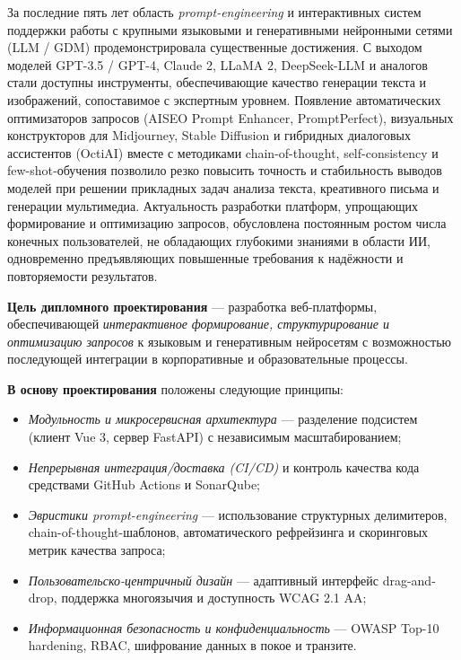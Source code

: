 
За последние пять лет область \textit{prompt-engineering} и интерактивных
систем поддержки работы с крупными языковыми и генеративными нейронными
сетями (LLM / GDM) продемонстрировала существенные достижения.
С выходом моделей GPT-3.5 / GPT-4, Claude 2, LLaMA 2, DeepSeek-LLM и
аналогов стали доступны инструменты, обеспечивающие качество генерации
текста и изображений, сопоставимое с экспертным уровнем.  Появление
автоматических оптимизаторов запросов (AISEO Prompt Enhancer,
PromptPerfect), визуальных конструкторов для Midjourney, Stable Diffusion
и гибридных диалоговых ассистентов (OctiAI) вместе с методиками
chain-of-thought, self-consistency и few-shot‐обучения позволило резко
повысить точность и стабильность выводов моделей при решении прикладных
задач анализа текста, креативного письма и генерации мультимедиа.
Актуальность разработки платформ, упрощающих формирование и
оптимизацию запросов, обусловлена постоянным ростом числа конечных
пользователей, не обладающих глубокими знаниями в области ИИ,
одновременно предъявляющих повышенные требования к
надёжности и повторяемости результатов.

\bigskip
\textbf{Цель дипломного проектирования} — разработка
веб-платформы, обеспечивающей \emph{интерактивное формирование,
структурирование и оптимизацию запросов} к языковым и генеративным
нейросетям с возможностью последующей интеграции в корпоративные и образовательные процессы.

\bigskip
\textbf{В основу проектирования} положены следующие принципы:
\begin{itemize}
  \item \emph{Модульность и микросервисная архитектура} —
        разделение подсистем (клиент Vue 3, сервер FastAPI)
         с независимым масштабированием;
  \item \emph{Непрерывная интеграция/доставка (CI/CD)} и контроль
        качества кода средствами GitHub Actions и SonarQube;
  \item \emph{Эвристики prompt-engineering} — использование
        структурных делимитеров, chain-of-thought-шаблонов,
        автоматического рефрейзинга и скоринговых метрик качества
        запроса;
  \item \emph{Пользовательско-центричный дизайн} —
        адаптивный интерфейс drag-and-drop, поддержка многоязычия и
        доступность WCAG 2.1 AA;
  \item \emph{Информационная безопасность и конфиденциальность} —
        OWASP Top-10 hardening, RBAC, шифрование данных в покое
        и транзите.
\end{itemize}

